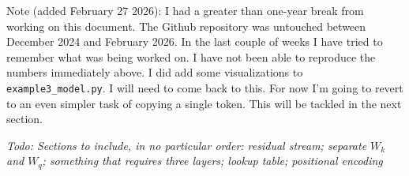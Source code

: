 \documentclass{article}
\newcommand{\todo}[1]{\emph{Todo: #1}}
\begin{document}


Note (added February 27 2026): I had a greater than one-year break from working on this document. The Github repository was untouched between December 2024 and February 2026. In the last couple of weeks I have tried to remember what was being worked on. I have not been able to reproduce the numbers immediately above. I did add some visualizations to \verb+example3_model.py+. I will need to come back to this. For now I'm going to revert to an even simpler task of copying a single token. This will be tackled in the next section.












\vfill

\noindent \todo{Sections to include, in no particular order: residual stream;
 separate $W_k$ and $W_q$; something that requires three layers;
 lookup table; positional encoding}
\end{document}
